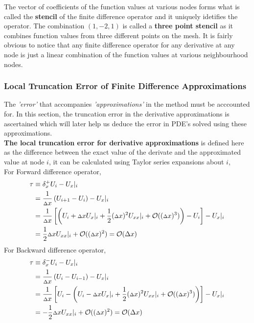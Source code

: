 The vector of coefficients of the function values at various nodes forms what is called the \textbf{stencil} of the finite difference operator and it uniquely idetifies the operator. The combination $(1,-2,1)$ is called a \textbf{three point stencil} as it combines function values from three different points on the mesh.
It is fairly obvious to notice that any finite difference operator for any derivative at any node is just a linear combination of the function values at various neighbourhood nodes.   

\subsubsection{Local Truncation Error of Finite Difference Approximations}
The \textit{'error'} that accompanies \textit{'approximations'} in the method must be acccounted for. In this section, the truncation error in the derivative approximations is ascertained which will later help us deduce the error in PDE's solved using these approximations.
\\[2mm]
\textbf{The local truncation error for derivative approximations} is defined here as the difference between the exact value of the derivate and the approximated value at node $i$, it can be calculated using Taylor series expansions about $i$,\\[2mm]
For Forward difference operator,\autocite{mitocw}\autocite{thomas2013numerical}
\begin{align*}
    \tau &\equiv \delta _ x^{+} U_ i - {U_ x}|_ i \\
    &= \frac{1}{{\scriptstyle \Delta} x}\left( U_ {i+1} - U_{i}\right) - {U_ x}|_i \\
    &= \frac{1}{{\scriptstyle \Delta} x}\left[ \left( U_ i + {\scriptstyle \Delta} x{U_ x}|_ i + \frac{1}{2}({\scriptstyle \Delta} x)^2{U_{xx}}|_ i + \mathcal{O}(({\scriptstyle \Delta} x)^3)\right) - U_i \right] - {U_ x}|_ i \\
    &= \frac{1}{2}{\scriptstyle \Delta} x{U_{xx}}|_ i + \mathcal{O}(({\scriptstyle \Delta} x)^2) = \mathcal{O}(\Delta x)
\end{align*}
For Backward difference operator, 
\begin{align*}
    \tau &\equiv \delta _ x^{-} U_ i - {U_ x}|_ i \\
    &= \frac{1}{{\scriptstyle \Delta} x}\left( U_ i - U_{i-1}\right) - {U_ x}|_i \\
    &= \frac{1}{{\scriptstyle \Delta} x}\left[ U_ i - \left( U_ i - {\scriptstyle \Delta} x{U_ x}|_ i + \frac{1}{2}({\scriptstyle \Delta} x)^2{U_{xx}}|_ i + \mathcal{O}(({\scriptstyle \Delta} x)^3)\right)\right] - {U_ x}|_ i \\
    &= -\frac{1}{2}{\scriptstyle \Delta} x{U_{xx}}|_ i + \mathcal{O}(({\scriptstyle \Delta} x)^2) = \mathcal{O}(\Delta x)  
\end{align*}
